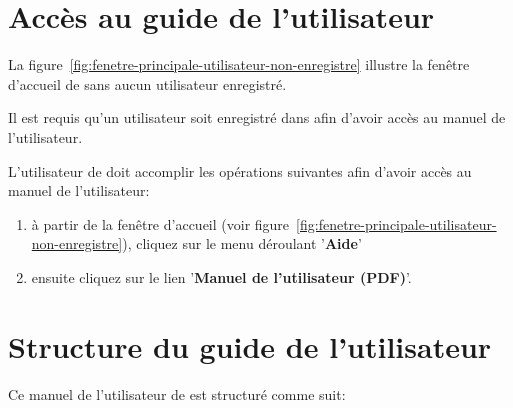 \section{Acc\`es au guide de l'utilisateur}

La figure~\ref{fig:fenetre-principale-utilisateur-non-enregistre}
illustre la fen\^etre d'accueil de \yeren sans aucun utilisateur
enregistr\'e.

Il est requis qu'un utilisateur soit enregistr\'e
dans \yeren afin d'avoir acc\`es au manuel de l'utilisateur.

L'utilisateur de \yeren doit accomplir les op\'erations
suivantes afin d'avoir acc\`es au manuel de l'utilisateur:
\begin{enumerate}[1)]
	\item \`a partir de la fen\^etre d'accueil
		(voir figure~\ref{fig:fenetre-principale-utilisateur-non-enregistre}),
		cliquez sur le menu d\'eroulant '\textbf{Aide}'
	\item ensuite cliquez sur le lien '\textbf{Manuel de l'utilisateur (PDF)}'.
\end{enumerate}

\section{Structure du guide de l'utilisateur}
Ce manuel de  l'utilisateur de \yeren est structur\'e
comme suit:

